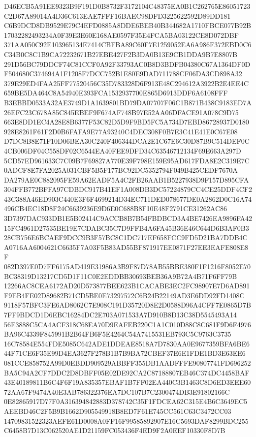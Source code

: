 \documentclass[UTF8,fontset=fandol,zihao=-4,a4paper]{ctexart}
\begin{document}
{{D46ECB5A91EE9323B9F191D0B8732F3172104C48375EA0B1C262765E86051723C2D67A89014A4D36C613EAE7FFF16BAEC98DFD3225622592D89DD181
C6B9DCD8DB9529E79C4EFD0885A8DDE6BEB40B344682A1710FBCE077B92B17032282493234A0F39E3E60E168AE0597F35E4FCA5BA03122CE8D072DBF
371AA050C92E103965134E7414CBFBA89C60F7E1259052EA6A986F372EBD0C6C34B0C8C1B9CA72232671B27EBE427F2B3DA0B13E9CB1DDA9B7E8807B
291D56BC79DDCF74C81CCF0A92F33793AC0B8D3BDFB04380C67A1364DF0DF504680C374694A1F1208F7DCC752B1E80E9DAD711788CF06DA3CD898A32
379E29ED4FAA25FF77520456C35D783328D6F913E48C294612A3922B2E4EE4C659BE5DA464C8A54940E393FCA1532937700E865D6913DDF6A6108FFF
B3EBBD0533A32AE3749D1A1639801BD79DA07707F06C1B871B438C9183ED7A26EFC23C678A85C845EBEF9F674AF748B97E52AA06DFACE91A078C9D75
663E8DD1EC4A28E8B6377F53C82D5D9F9BD5FC5A734D7EBD86728937D0180928E8261F61F2D0B6FAFA9E77A93240C4DEC308F0B7E3C41E41E0C67E08
D7DC8B8E71F10D06BEA30C240F406344DCA2E1C67E6C30D87B9C514DEF0C4CB006DF04C558DF02C6544EA40FEE9DFD34C63546712134F69E663A297D
5CD57ED961633C7C09B7F69827A770E39F798E159E95AD617FDA8E2C319E7C0ADCF8E7FA2025A031CBF5B5F177BC92DC5352794F049B425CEDF7670A
DA279AE0C882095FE59A62EADF5A4C2FB26AAB1B5227938D9F157D895CFA304FFB772BFFA97CDBDC917B41EF1A008DB3DC57224879CC4CE25DDF4CF2
43C388A46ED903C440E3F6F4699214D34EC711DED078677DE0A2862D0C16A74496CB4EC18D8F24C6639236E9D6E0C688B8F10E48F2791CE31262AC86
3D7397DAC933DB1E5B02414C9ACCB8B7B54FBDBCD3A4BE7426EA9896FA4215FC4961D27535BE19E7CDABC35C7D9FFB4A6FA45B36E46C644D6B3AF0B3
28CB756E6BCAEF9DCC9B3F57BC8C1DC717EF658FCC9FD5D21BA7DDB4CA0716AA6004621C6635F7A03F5B83AD55BF871917EE0871F27EE3EAFE808E8F
082D397E0D7FF6175AD419E31986A3B9F87D78AB55BBE380F1F1216F8052E70BC38319D13217CD5D1F11C0E2EDDBB30693BEB36A9B72A4B71F6FF79B
12266AC8CEA6172AD20D573877BEE623B1CACABE3EC2FC98907E7D6AD891F9EB4FE02D89682B71CD5BE0E73297572C6B24B22149AD3E6DD92FD1408C
9118F57BFC3FE6AD8062C7E908C191D35720D8E2D0588D96A4CFF7E0865D7B7FF9BDCD1D6EBC16284DC2E703A071533A7D910B8D13C38D5545493A14
56E3888C5CA4ACF318C68EA70D9EAFEB220C1A1C010D88C8C681F9D6F4976BA96C4339F845991B2B64FB6F5E4264C54A7415531EB793C5C9763C3735
16C78584E554FDE5085C642ADE1DDEAE8518A7D7830AA0E9677359BFA6BE644F71CE6F35E99D4EA3627F278B1B7B9BA72CBEF37E6E1FDE1BD3E63EE6
081CCE858752A99D0EBDD909529ABBFF355DB1AADFFFE90807741FD696252BA5C94A2CF7DDC2D8DBFF05E02DE92CA2C87188807EB46C374DC4458BAF
43E40189811B6C4F6F19A835357EBAF1B7FF02EA440C3B1463C8D6ED3EEE6072AA67F9474A40E3AB786322376EA7DC107B7C2300474DB3E91802166C
0E82865917D77F0A316394842883D378742C35F1FDCEA62C315E4B6C3649EC5AEEBD46C2F5B9B1662D905549918B8ED7F61E745CC561C63C3472CC03
14709831522323AEFE61D0008A0FF16F99585892907E16C5693DAF8299BDC255C6458B7D13C062520AE1D21159FC053436F4ED9F2A0EEF10330F8D7B
}}
\end{document}

